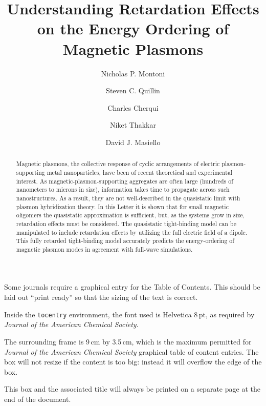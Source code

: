 \documentclass[journal=jpccck,manuscript=article]{achemso}
\author{Nicholas P. Montoni}
\author{Steven C. Quillin}
\author{Charles Cherqui}
\affiliation[Department of Chemistry, University of Washington]
{Department of Chemistry, University of Washington, Seattle, WA 98195}
\author{Niket Thakkar}
\affiliation[Department of Applied Mathematics, University of Washington]
{Department of Applied Mathematics, University of Washington, Seattle, WA 98195}
\author{David J. Masiello}
\affiliation[Department of Chemistry, University of Washington]
{Department of Chemistry, University of Washington, Seattle, WA 98195}
\title[]
    {Understanding Retardation Effects on the Energy Ordering of Magnetic Plasmons}
\begin{document}
\begin{tocentry}

Some journals require a graphical entry for the Table of Contents.
This should be laid out ``print ready'' so that the sizing of the
text is correct.

Inside the \texttt{tocentry} environment, the font used is Helvetica
8\,pt, as required by \emph{Journal of the American Chemical
Society}.

The surrounding frame is 9\,cm by 3.5\,cm, which is the maximum
permitted for  \emph{Journal of the American Chemical Society}
graphical table of content entries. The box will not resize if the
content is too big: instead it will overflow the edge of the box.

This box and the associated title will always be printed on a
separate page at the end of the document.

\end{tocentry}

\begin{abstract}
Magnetic plasmons, the collective response of cyclic arrangements of electric plasmon-supporting metal nanoparticles, have been of recent theoretical and experimental interest. As magnetic-plasmon-supporting aggregates are often large (hundreds of nanometers to microns in size), information takes time to propagate across such nanostructures. As a result, they are not well-described in the quasistatic limit with plasmon hybridization theory. In this Letter it is shown that for small magnetic oligomers the quasistatic approximation is sufficient, but, as the systems grow in size, retardation effects must be considered. The quasistatic tight-binding model can be manipulated to include retardation effects by utilizing the full electric field of a dipole. This fully retarded tight-binding model accurately predicts the energy-ordering of magnetic plasmon modes in agreement with full-wave simulations.
\end{abstract}
\end{document}
